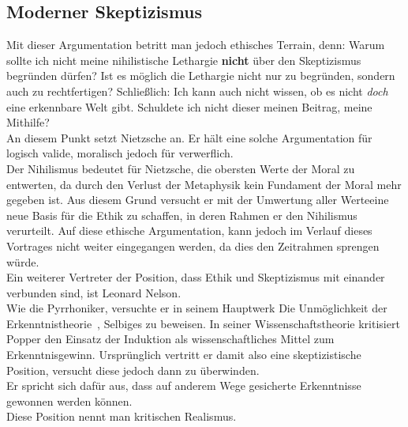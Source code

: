 \documentclass[11pt,a4paper]{article}
\begin{document}
	\subsection{Moderner Skeptizismus}
Mit dieser Argumentation betritt man jedoch ethisches Terrain, denn: Warum sollte ich nicht meine nihilistische Lethargie \textbf{nicht} über den Skeptizismus begründen dürfen? Ist es möglich die Lethargie nicht nur zu begründen, sondern auch zu rechtfertigen? Schließlich: Ich kann auch nicht wissen, ob es nicht \emph{doch} eine erkennbare Welt gibt. Schuldete ich nicht dieser meinen Beitrag, meine Mithilfe?\\
An diesem Punkt setzt Nietzsche an. Er hält eine solche Argumentation für logisch valide, moralisch jedoch für verwerflich.\\%
Der Nihilismus bedeutet für Nietzsche, die obersten Werte der Moral zu entwerten, da durch den Verlust der Metaphysik kein Fundament der Moral mehr gegeben ist. Aus diesem Grund versucht er mit der \glqq Umwertung aller Werte\grqq eine neue Basis für die Ethik zu schaffen, in deren Rahmen er den Nihilismus verurteilt. Auf diese ethische Argumentation, kann jedoch im Verlauf dieses Vortrages nicht weiter eingegangen werden, da dies den Zeitrahmen sprengen würde.\\
Ein weiterer Vertreter der Position, dass Ethik und Skeptizismus mit einander verbunden sind, ist Leonard Nelson.\\
Wie die Pyrrhoniker, versuchte er in seinem Hauptwerk \glqq Die Unmöglichkeit der Erkenntnistheorie\grqq\ , Selbiges zu beweisen.
In seiner Wissenschaftstheorie kritisiert Popper den Einsatz der Induktion als wissenschaftliches Mittel zum Erkenntnisgewinn. Ursprünglich vertritt er damit also eine skeptizistische Position, versucht diese jedoch dann zu überwinden.\\
Er spricht sich dafür aus, dass auf anderem Wege gesicherte Erkenntnisse gewonnen werden können.\\
Diese Position nennt man kritischen Realismus.%


\end{document}
